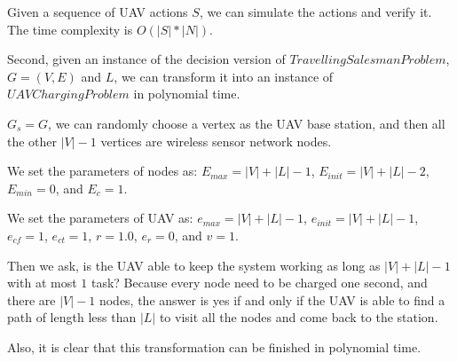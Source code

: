 Given a sequence of UAV actions $S$, we can simulate the actions and verify it. The time complexity is $O(|S| * |N|)$.

Second, given an instance of the decision version of $Travelling Salesman Problem$, $G = (V, E)$ and $L$, we can transform it into an instance of $UAV Charging Problem$ in polynomial time.

$G_s = G$, we can randomly choose a vertex as the UAV base station, and then all the other $|V|-1$ vertices are wireless sensor network nodes.

We set the parameters of nodes as: $E_{max} = |V| + |L| - 1$, $E_{init} = |V| + |L| - 2$, $E_{min} = 0$, and $E_{c} = 1$.

We set the parameters of UAV as: $e_{max} = |V| + |L| - 1$, $e_{init} = |V| + |L| - 1$, $e_{cf} = 1$, $e_{ct} = 1$, $r = 1.0$, $e_r = 0$, and $v = 1$.

Then we ask, is the UAV able to keep the system working as long as $|V| + |L| - 1$ with at most $1$ task? Because every node need to be charged one second, and there are $|V|-1$ nodes, the answer is yes if and only if the UAV is able to find a path of length less than $|L|$ to visit all the nodes and come back to the station.

Also, it is clear that this transformation can be finished in polynomial time.
